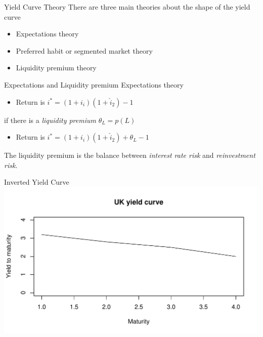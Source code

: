 \documentclass[14pt,xcolor=pdftex,dvipsnames,table]{beamer}\usepackage[]{graphicx}\usepackage[]{color}
\makeatletter
\def\maxwidth{ %
  \ifdim\Gin@nat@width>\linewidth
    \linewidth
  \else
    \Gin@nat@width
  \fi
}
\newenvironment{knitrout}{}{} %
\makeatother
\begin{document}
\begin{frame}{Yield Curve Theory}
There are three main theories about the shape of the yield curve
\begin{itemize}[<+-| alert@+>]
\item Expectations theory
\item Preferred habit or segmented market theory
\item Liquidity premium theory
\end{itemize}
\end{frame}

\begin{frame}{Expectations and Liquidity premium}
Expectations theory

\begin{itemize}[<+-| alert@+>]
\item Return is $i^* = (1+i_i)(1+\hat{i}_2) -1$
\end{itemize}

if there  is a \emph{liquidity premium} $\theta_L = p(L)$

\begin{itemize}[<+-| alert@+>]
\item Return is $i^* = (1+i_i)(1+\hat{i}_2) + \theta_L -1$ 
\end{itemize}

The liquidity premium is the balance between \emph{interest rate risk} and \emph{reinvestment risk}.

\end{frame}

\begin{frame}{Inverted Yield Curve}
\begin{knitrout}
\color{fgcolor}
\includegraphics[width=\maxwidth]{figure/yc2-1} 

\end{knitrout}
\end{frame}
\end{document}

